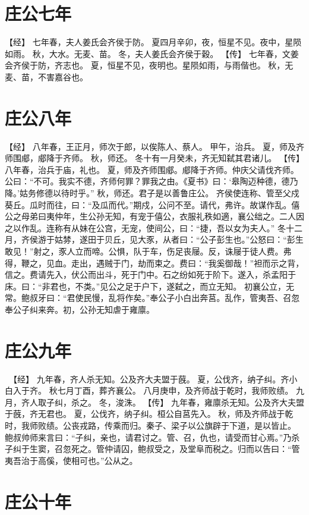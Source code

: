 \documentclass[a4paper,12pt,UTF8,twoside]{ctexbook}
\begin{document}
\section{庄公七年}

【经】
七年春，夫人姜氏会齐侯于防。
夏四月辛卯，夜，恒星不见。夜中，星陨如雨。
秋，大水。无麦、苗。
冬，夫人姜氏会齐侯于穀。
【传】
七年春，文姜会齐侯于防，齐志也。
夏，恒星不见，夜明也。星陨如雨，与雨偕也。
秋，无麦、苗，不害嘉谷也。

\section{庄公八年}

【经】
八年春，王正月，师次于郎，以俟陈人、蔡人。
甲午，治兵。
夏，师及齐师围郕，郕降于齐师。
秋，师还。
冬十有一月癸未，齐无知弑其君诸儿。
【传】
八年春，治兵于庙，礼也。
夏，师及齐师围郕。郕降于齐师。仲庆父请伐齐师。公曰：“不可。我实不德，齐师何罪？罪我之由。《夏书》曰：‘皋陶迈种德，德乃降。’姑务修德以待时乎。”
秋，师还。君子是以善鲁庄公。
齐侯使连称、管至父戍葵丘。瓜时而往，曰：“及瓜而代。”期戍，公问不至。请代，弗许。故谋作乱。僖公之母弟曰夷仲年，生公孙无知，有宠于僖公，衣服礼秩如適，襄公绌之。二人因之以作乱。连称有从妹在公宫，无宠，使间公，曰：“捷，吾以女为夫人。”
冬十二月，齐侯游于姑棼，遂田于贝丘，见大豕，从者曰：“公子彭生也。”公怒曰：“彭生敢见！”射之，豕人立而啼。公惧，队于车，伤足丧屦。反，诛屦于徒人费。弗得，鞭之，见血。走出，遇贼于门，劫而束之。费曰：“我奚御哉！”袒而示之背，信之。费请先入，伏公而出斗，死于门中。石之纷如死于阶下。遂入，杀孟阳于床。曰：“非君也，不类。”见公之足于户下，遂弑之，而立无知。
初襄公立，无常。鲍叔牙曰：“君使民慢，乱将作矣。”奉公子小白出奔莒。乱作，管夷吾、召忽奉公子纠来奔。初，公孙无知虐于雍廪。

\section{庄公九年}

　【经】
九年春，齐人杀无知。公及齐大夫盟于蔇。
夏，公伐齐，纳子纠。齐小白入于齐。
秋七月丁酉，葬齐襄公。
八月庚申，及齐师战于乾时，我师败绩。
九月，齐人取子纠，杀之。
冬，浚洙。
【传】
九年春，雍廪杀无知。公及齐大夫盟于蔇，齐无君也。
夏，公伐齐，纳子纠。桓公自莒先入。
秋，师及齐师战于乾时，我师败绩。公丧戎路，传乘而归。秦子、梁子以公旗辟于下道，是以皆止。
鲍叔帅师来言曰：“子纠，亲也，请君讨之。管、召，仇也，请受而甘心焉。”乃杀子纠于生窦，召忽死之。管仲请囚，鲍叔受之，及堂阜而税之。归而以告曰：“管夷吾治于高傒，使相可也。”公从之。

\section{庄公十年}
\end{document}
